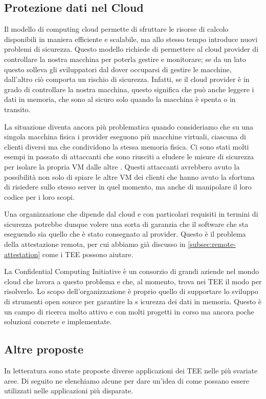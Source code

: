 \documentclass[12pt,italian]{report}
\begin{document}
\subsection{Protezione dati nel Cloud}
\label{subsec:protezione-dati-cloud}
Il modello di computing cloud permette di sfruttare le risorse di calcolo
disponibili in maniera efficiente e scalabile, ma allo stesso tempo introduce
nuovi problemi di sicurezza.
Questo modello richiede di permettere al cloud provider di controllare la
nostra macchina per poterla gestire e monitorare; se da un lato questo solleva
gli sviluppatori dal dover occuparsi di gestire le macchine, dall'altro ciò
comporta un rischio di sicurezza.
Infatti, se il cloud provider è in grado di controllare la nostra macchina,
questo significa che può anche leggere i dati in memoria, che sono al sicuro
solo quando la macchina è spenta o in transito.

La situazione diventa ancora più problematica quando consideriamo che su
una singola macchina fisica i provider eseguono più macchine virtuali, ciascuna
di clienti diversi ma che condividono la stessa memoria fisica.
Ci sono stati molti esempi in passato di attaccanti che sono riusciti a eludere
le misure di sicurezza per isolare la propria VM dalle altre
\cite{vmescape1}\cite{vmescape2}\cite{vmescape3}.
Questi attaccanti avrebbero avuto la possibilità non solo di spiare le altre
VM dei clienti che hanno avuto la sfortuna di risiedere sullo stesso server in
quel momento, ma anche di manipolare il loro codice per i loro scopi.

Una organizzazione che dipende dal cloud e con particolari requisiti in
termini di sicurezza potrebbe dunque volere una sorta di garanzia che il
software che sta eseguendo sia quello che è stato consegnato al provider.
Questo è il problema della attestazione remota, per cui abbiamo già discusso
in \ref{subsec:remote-attestation} come i TEE possono aiutare.

La Confidential Computing Initiative\cite{confidential_computing_initiative}
è un consorzio di grandi aziende nel mondo cloud che lavora a questo problema
e che, al momento, trova nei TEE il modo per risolverlo.
Lo scopo dell'organizzazione è proprio quello di supportare lo sviluppo
di strumenti open source per garantire la s icurezza dei dati in memoria.
Questo è un campo di ricerca molto attivo e con molti progetti in corso ma
ancora poche soluzioni concrete e implementate.

\subsection{Altre proposte}
\label{subsec:altre-proposte}
In letteratura sono state proposte diverse applicazioni dei TEE nelle più
svariate aree. Di seguito ne elenchiamo alcune per dare un'idea di come
possano essere utilizzati nelle applicazioni più disparate.
\end{document}
